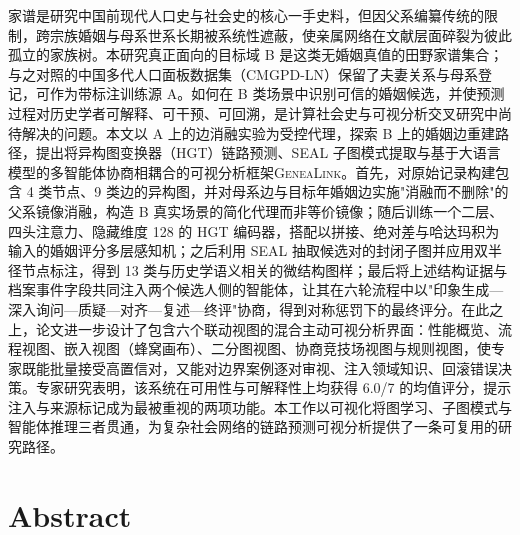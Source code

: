 家谱是研究中国前现代人口史与社会史的核心一手史料，但因父系编纂传统的限制，跨宗族婚姻与母系世系长期被系统性遮蔽，使亲属网络在文献层面碎裂为彼此孤立的家族树。本研究真正面向的目标域 B 是这类无婚姻真值的田野家谱集合；与之对照的中国多代人口面板数据集（CMGPD-LN）保留了夫妻关系与母系登记，可作为带标注训练源 A。如何在 B 类场景中识别可信的婚姻候选，并使预测过程对历史学者可解释、可干预、可回溯，是计算社会史与可视分析交叉研究中尚待解决的问题。本文以 A 上的边消融实验为受控代理，探索 B 上的婚姻边重建路径，提出将异构图变换器（HGT）链路预测、SEAL 子图模式提取与基于大语言模型的多智能体协商相耦合的可视分析框架\textsc{GeneaLink}。首先，对原始记录构建包含 4 类节点、9 类边的异构图，并对母系边与目标年婚姻边实施"消融而不删除"的父系镜像消融，构造 B 真实场景的简化代理而非等价镜像；随后训练一个二层、四头注意力、隐藏维度 128 的 HGT 编码器，搭配以拼接、绝对差与哈达玛积为输入的婚姻评分多层感知机；之后利用 SEAL 抽取候选对的封闭子图并应用双半径节点标注，得到 13 类与历史学语义相关的微结构图样；最后将上述结构证据与档案事件字段共同注入两个候选人侧的智能体，让其在六轮流程中以"印象生成—深入询问—质疑—对齐—复述—终评"协商，得到对称惩罚下的最终评分。在此之上，论文进一步设计了包含六个联动视图的混合主动可视分析界面：性能概览、流程视图、嵌入视图（蜂窝画布）、二分图视图、协商竞技场视图与规则视图，使专家既能批量接受高置信对，又能对边界案例逐对审视、注入领域知识、回滚错误决策。专家研究表明，该系统在可用性与可解释性上均获得 6.0/7 的均值评分，提示注入与来源标记成为最被重视的两项功能。本工作以可视化将图学习、子图模式与智能体推理三者贯通，为复杂社会网络的链路预测可视分析提供了一条可复用的研究路径。

\chapter*{Abstract}

